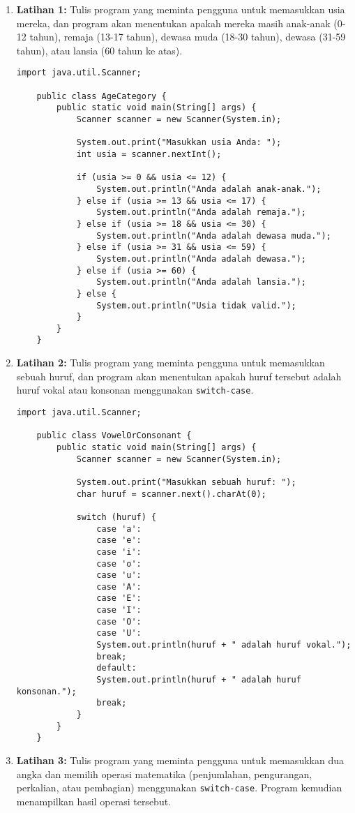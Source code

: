 \begin{enumerate}
	\item \textbf{Latihan 1:} Tulis program yang meminta pengguna untuk memasukkan usia mereka, dan program akan menentukan apakah mereka masih anak-anak (0-12 tahun), remaja (13-17 tahun), dewasa muda (18-30 tahun), dewasa (31-59 tahun), atau lansia (60 tahun ke atas).


\begin{lstlisting}[style=JavaStyle]
	import java.util.Scanner;
	
	public class AgeCategory {
		public static void main(String[] args) {
			Scanner scanner = new Scanner(System.in);
			
			System.out.print("Masukkan usia Anda: ");
			int usia = scanner.nextInt();
			
			if (usia >= 0 && usia <= 12) {
				System.out.println("Anda adalah anak-anak.");
			} else if (usia >= 13 && usia <= 17) {
				System.out.println("Anda adalah remaja.");
			} else if (usia >= 18 && usia <= 30) {
				System.out.println("Anda adalah dewasa muda.");
			} else if (usia >= 31 && usia <= 59) {
				System.out.println("Anda adalah dewasa.");
			} else if (usia >= 60) {
				System.out.println("Anda adalah lansia.");
			} else {
				System.out.println("Usia tidak valid.");
			}
		}
	}
\end{lstlisting}

\item \textbf{Latihan 2:} Tulis program yang meminta pengguna untuk memasukkan sebuah huruf, dan program akan menentukan apakah huruf tersebut adalah huruf vokal atau konsonan menggunakan \texttt{switch-case}.

\begin{lstlisting}[style=JavaStyle]
	import java.util.Scanner;
	
	public class VowelOrConsonant {
		public static void main(String[] args) {
			Scanner scanner = new Scanner(System.in);
			
			System.out.print("Masukkan sebuah huruf: ");
			char huruf = scanner.next().charAt(0);
			
			switch (huruf) {
				case 'a':
				case 'e':
				case 'i':
				case 'o':
				case 'u':
				case 'A':
				case 'E':
				case 'I':
				case 'O':
				case 'U':
				System.out.println(huruf + " adalah huruf vokal.");
				break;
				default:
				System.out.println(huruf + " adalah huruf konsonan.");
				break;
			}
		}
	}
\end{lstlisting}

\item \textbf{Latihan 3:} Tulis program yang meminta pengguna untuk memasukkan dua angka dan memilih operasi matematika (penjumlahan, pengurangan, perkalian, atau pembagian) menggunakan \texttt{switch-case}. Program kemudian menampilkan hasil operasi tersebut.


\end{enumerate}
